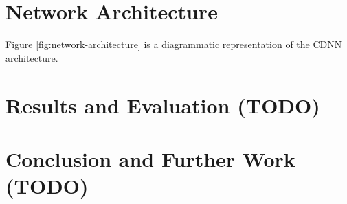 \documentclass[journal]{IEEEtran}
\begin{document}
\section{Network Architecture}
Figure \ref{fig:network-architecture} is a diagrammatic representation of the
CDNN architecture.
\begin{figure*}[t]
    \caption{The network architecture of the CDNN, where the top row indicates
    the function of the current layer, and the bottom row indicates the shape of
    the tensor \emph{following} the transformation. With a batch size of $16$, a
    four-way batch tensor of RGB $224 \times 224$ images is translated to a set
    of probability vectors for each image, over each of the 102 categories.}
    \label{fig:network-architecture}
\end{figure*}

\section{Results and Evaluation (TODO)}
\section{Conclusion and Further Work (TODO)}

\clearpage %


\end{document}
